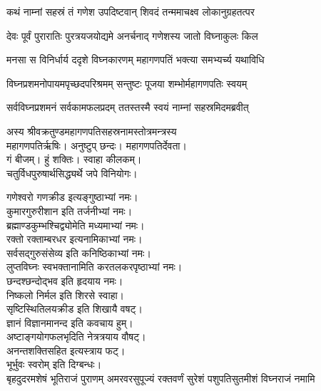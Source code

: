 

\twolineshloka
{कथं नाम्नां सहस्रं तं गणेश उपदिष्टवान्}
{शिवदं तन्ममाचक्ष्व लोकानुग्रहतत्पर}


\twolineshloka
{देवः पूर्वं पुरारातिः पुरत्रयजयोद्यमे}
{अनर्चनाद् गणेशस्य जातो विघ्नाकुलः किल}

\twolineshloka
{मनसा स विनिर्धार्य ददृशे विघ्नकारणम्}
{महागणपतिं भक्त्या समभ्यर्च्य यथाविधि}

\twolineshloka
{विघ्नप्रशमनोपायमपृच्छदपरिश्रमम्}
{सन्तुष्टः पूजया शम्भोर्महागणपतिः स्वयम्}

\twolineshloka
{सर्वविघ्नप्रशमनं सर्वकामफलप्रदम्}
{ततस्तस्मै स्वयं नाम्नां सहस्रमिदमब्रवीत्}

अस्य श्रीवक्रतुण्डमहागणपतिसहस्रनामस्तोत्रमन्त्रस्य\\
महागणपतिर्ऋषिः। अनुष्टुप् छन्दः। महागणपतिर्देवता।\\
गं बीजम्। हुं शक्तिः। स्वाहा कीलकम्।\\
चतुर्विधपुरुषार्थसिद्ध्यर्थे जपे विनियोगः।

{गणेश्वरो गणक्रीड इत्यङ्गुष्ठाभ्यां नमः।}\\
{कुमारगुरुरीशान इति तर्जनीभ्यां नमः।}\\
{ब्रह्माण्डकुम्भश्चिद्व्योमेति मध्यमाभ्यां नमः।}\\
{रक्तो रक्ताम्बरधर इत्यनामिकाभ्यां नमः।}\\
{सर्वसद्गुरुसंसेव्य इति कनिष्ठिकाभ्यां नमः।}\\
{लुप्तविघ्नः स्वभक्तानामिति करतलकरपृष्ठाभ्यां नमः।}\\


छन्दश्छन्दोद्भव इति हृदयाय नमः।\\
निष्कलो निर्मल इति शिरसे स्वाहा।\\
सृष्टिस्थितिलयक्रीड इति शिखायै वषट्।\\
ज्ञानं विज्ञानमानन्द इति कवचाय हुम्।\\
अष्टाङ्गयोगफलभृदिति नेत्रत्रयाय वौषट्।\\
अनन्तशक्तिसहित इत्यस्त्राय फट्।\\
भूर्भुवः स्वरोम् इति दिग्बन्धः।\\


{बृहदुदरमशेषं भूतिराजं पुराणम्}
{अमरवरसुपूज्यं रक्तवर्णं सुरेशं}
{पशुपतिसुतमीशं विघ्नराजं नमामि}

